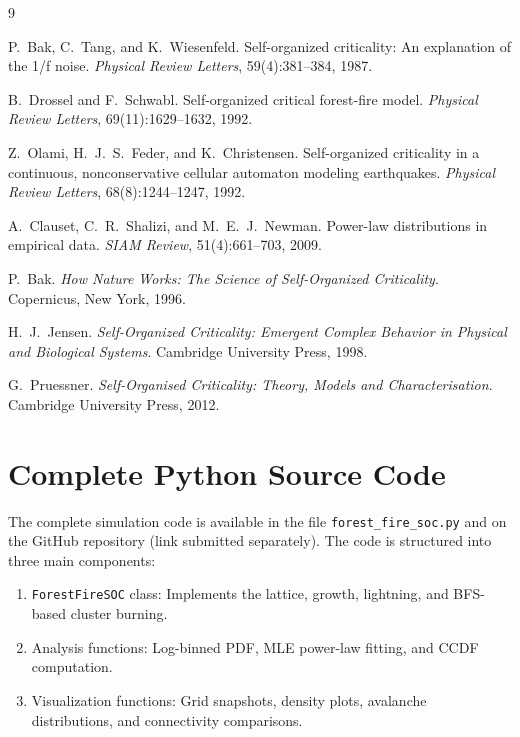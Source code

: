 \documentclass[12pt, a4paper, twocolumn]{article}
\begin{document}

\begin{thebibliography}{9}

P.~Bak, C.~Tang, and K.~Wiesenfeld.
\newblock Self-organized criticality: An explanation of the 1/f noise.
\newblock \textit{Physical Review Letters}, 59(4):381--384, 1987.

B.~Drossel and F.~Schwabl.
\newblock Self-organized critical forest-fire model.
\newblock \textit{Physical Review Letters}, 69(11):1629--1632, 1992.

Z.~Olami, H.~J.~S.~Feder, and K.~Christensen.
\newblock Self-organized criticality in a continuous, nonconservative cellular automaton modeling earthquakes.
\newblock \textit{Physical Review Letters}, 68(8):1244--1247, 1992.

A.~Clauset, C.~R.~Shalizi, and M.~E.~J.~Newman.
\newblock Power-law distributions in empirical data.
\newblock \textit{SIAM Review}, 51(4):661--703, 2009.

P.~Bak.
\newblock \textit{How Nature Works: The Science of Self-Organized Criticality}.
\newblock Copernicus, New York, 1996.

H.~J.~Jensen.
\newblock \textit{Self-Organized Criticality: Emergent Complex Behavior in Physical and Biological Systems}.
\newblock Cambridge University Press, 1998.

G.~Pruessner.
\newblock \textit{Self-Organised Criticality: Theory, Models and Characterisation}.
\newblock Cambridge University Press, 2012.

\end{thebibliography}

\appendix
\section{Complete Python Source Code}
\label{app:code}

The complete simulation code is available in the file \texttt{forest\_fire\_soc.py} and on the GitHub repository (link submitted separately).
The code is structured into three main components:

\begin{enumerate}[leftmargin=*]
    \item \texttt{ForestFireSOC} class: Implements the lattice, growth, lightning, and BFS-based cluster burning.
    \item Analysis functions: Log-binned PDF, MLE power-law fitting, and CCDF computation.
    \item Visualization functions: Grid snapshots, density plots, avalanche distributions, and connectivity comparisons.
\end{enumerate}
\end{document}
